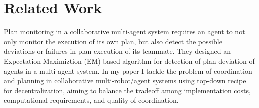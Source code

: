 \documentclass[conference]{IEEEtran}
\begin{document}
%





\section{Related Work}
Plan monitoring in a collaborative multi-agent system requires an agent to not only monitor the execution of its own plan, but also detect the possible deviations or failures in plan execution of its teammate. They designed an Expectation Maximiztion (EM) based algorithm for detection of plan deviation of agents in a multi-agent system\cite{banerjee2016detection}.
In my paper I tackle the problem of coordination and planning in collaborative multi-robot/agent systems using top-down recipe for decentralization, aiming to balance the tradeoff among implementation costs, computational requirements, and quality of coordination.
\end{document}
